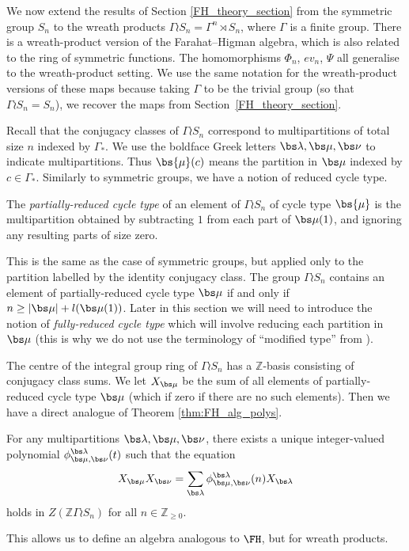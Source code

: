 We now extend the results of Section \ref{FH_theory_section} from the symmetric group $S_n$ to the wreath products $\Gamma \wr S_n = \Gamma ^n \rtimes S_n$, where $\Gamma$ is a finite group. There is a wreath-product version of the Farahat--Higman algebra, which is also related to the ring of symmetric functions. The homomorphisms $\Phi_n$, $ev_n$, $\Psi$ all generalise to the wreath-product setting. We use the same notation for the wreath-product versions of these maps because taking $\Gamma$ to be the trivial group (so that $\Gamma \wr S_n = S_n$), we recover the maps from Section~\ref{FH_theory_section}.

Recall that the conjugacy classes of $\Gamma \wr S_n$ correspond to multipartitions of total size $n$ indexed by $\Gamma_*$. We use the boldface Greek letters $\bs \lambda, \bs \mu, \bs \nu$ to indicate multipartitions. Thus $\bs{\mu}(c)$ means the partition in $\bs \mu$ indexed by $c \in \Gamma_*$. Similarly to symmetric groups, we have a notion of reduced cycle type. 
\begin{definition}
The \emph{partially-reduced cycle type} of an element of $\Gamma \wr S_n$ of cycle type $\bs{\mu}$ is the multipartition obtained by subtracting $1$ from each part of $\bs \mu(1)$, and ignoring any resulting parts of size zero. 
\end{definition}

This is the same as the case of symmetric groups, but applied only to the partition labelled by the identity conjugacy class. The group $\Gamma \wr S_n$ contains an element of partially-reduced cycle type $\bs \mu$ if and only if $n \geq |\bs \mu| + l(\bs \mu(1))$. Later in this section we will need to introduce the notion of \emph{fully-reduced cycle type} which will involve reducing each partition in $\bs \mu$ (this is why we do not use the terminology of ``modified type'' from \cite{Wang1}).

The centre of the integral group ring of $\Gamma \wr S_n$ has a $\mathbb{Z}$-basis consisting of conjugacy class sums. We let $X_{\bs \mu}$ be the sum of all elements of partially-reduced cycle type $\bs \mu$ (which if zero if there are no such elements). Then we have a direct analogue of Theorem \ref{thm:FH_alg_polys}.

\begin{theorem} \label{FH_g_alg_polys_thm}
For any multipartitions $\bs \lambda, \bs\mu, \bs\nu$, there exists a unique integer-valued polynomial $\phi_{\bs\mu, \bs\nu}^{\bs\lambda}(t)$ such that the equation
\[
X_{\bs\mu} X_{\bs\nu} = \sum_{\bs\lambda} \phi_{\bs\mu, \bs\nu}^{\bs\lambda}(n)X_{\bs\lambda}
\]
holds in $Z(\mathbb{Z} \Gamma \wr S_n)$ for all $n \in \mathbb{Z}_{\geq 0}$.
\end{theorem}
This allows us to define an algebra analogous to $\FH$, but for wreath products.

